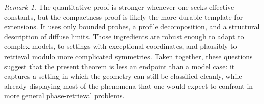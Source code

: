 \documentclass[11pt]{amsart}
\numberwithin{equation}{section}
\theoremstyle{definition}
\theoremstyle{remark}
\newtheorem{remark}[theorem]{Remark}
\begin{document}
\begin{remark}
The quantitative proof is stronger whenever one seeks effective constants, but
the compactness proof is likely the more durable template for extensions.  It
uses only bounded probes, a profile decomposition, and a structural
description of diffuse limits.  Those ingredients are robust enough to adapt
to complex models, to settings with exceptional coordinates, and plausibly to
retrieval modulo more complicated symmetries.  Taken together, these questions
suggest that the present theorem is less an endpoint than a model case: it
captures a setting in which the geometry can still be classified cleanly, while
already displaying most of the phenomena that one would expect to confront in
more general phase-retrieval problems.
\end{remark}

\nocite{calderbank2022stable}
\nocite{bandeira2014saving}
\nocite{eldar2014stability}
\nocite{cahill2016infinite}
\nocite{alaifari2017continuous}
\nocite{alaifari2021gabor}
\nocite{grohs2020survey}
\nocite{FOTP}
\nocite{christ2022examples}
\nocite{localphase}
\nocite{chen2019phase}
\nocite{MR3746047}
\nocite{KS}
\nocite{DB}
\nocite{MR3260258}
\nocite{MR3069958}
\nocite{MR4298599}
\nocite{sanz1984phase}
\nocite{balan2013}
\nocite{bartusel2021phase}
\nocite{casazza2017weak}
\nocite{casazza2017norm}
\nocite{casazza2013}
\nocite{AG-continuous-frames}
\nocite{fg22}
\nocite{MR3901674}
\nocite{grohs2021stable}
\nocite{grohs20212}
\nocite{luef2021gaussian}
\nocite{kashin2021sampling}
\nocite{LT21}
\nocite{DPSTT}
\nocite{NOU}
\nocite{akrami2021note}
\nocite{MR3367650}
\nocite{MR3275625}
\nocite{CCS-JMAA}
\nocite{CDOS}
\nocite{CHL}
\nocite{FG-atomic}
\nocite{MR2011364}
\nocite{MR0423039}
\nocite{our-paper}



\end{document}
